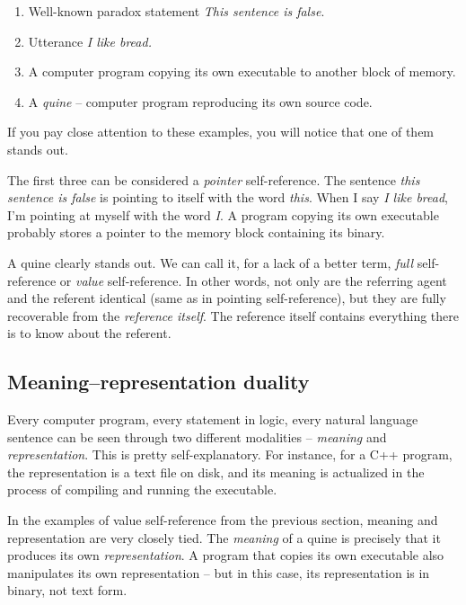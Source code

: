 \documentclass{article}
\begin{document}
\begin{enumerate}
    \item Well-known paradox statement \textit{This sentence is false}.
    \item Utterance \textit{I like bread.}
    \item A computer program copying its own executable to another block of memory.
    \item A \textit{quine} -- computer program reproducing its own source code.
\end{enumerate}

If you pay close attention to these examples, you will notice that one of them stands out.

The first three can be considered a \textit{pointer} self-reference. The sentence \textit{this
sentence is false} is pointing to itself with the word \textit{this}. When I say \textit{I
like bread}, I'm pointing at myself with the word \textit{I}. A program copying its own executable
probably stores a pointer to the memory block containing its binary.

A quine clearly stands out. We can call it, for a lack of a better term, \textit{full}
self-reference or \textit{value} self-reference. In other words, not only are the referring
agent and the referent identical (same as in pointing self-reference), but they are fully
recoverable from the \textit{reference itself}. The reference itself contains everything there
is to know about the referent.

\subsection{Meaning--representation duality}

Every computer program, every statement in logic, every natural language sentence
can be seen through two different modalities -- \textit{meaning} and \textit{representation}.
This is pretty self-explanatory. For instance, for a C++ program, the representation is a text
file on disk, and its meaning is actualized in the process of compiling and running the
executable.

In the examples of value self-reference from the previous section, meaning and representation
are very closely tied. The \textit{meaning} of a quine is precisely that it produces its own
\textit{representation}. A program that copies its own executable also manipulates its own
representation -- but in this case, its representation is in binary, not text form.
\end{document}
